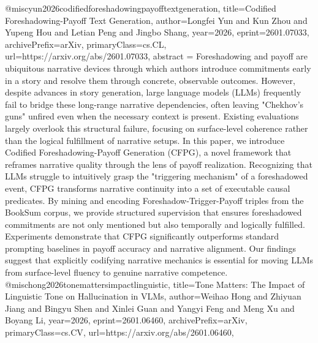 {}@misc{yun2026codifiedforeshadowingpayofftextgeneration,
      title={Codified Foreshadowing-Payoff Text Generation}, 
      author={Longfei Yun and Kun Zhou and Yupeng Hou and Letian Peng and Jingbo Shang},
      year={2026},
      eprint={2601.07033},
      archivePrefix={arXiv},
      primaryClass={cs.CL},
      url={https://arxiv.org/abs/2601.07033},
      abstract = {Foreshadowing and payoff are ubiquitous narrative devices through which authors introduce commitments early in a story and resolve them through concrete, observable outcomes. However, despite advances in story generation, large language models (LLMs) frequently fail to bridge these long-range narrative dependencies, often leaving "Chekhov's guns" unfired even when the necessary context is present. Existing evaluations largely overlook this structural failure, focusing on surface-level coherence rather than the logical fulfillment of narrative setups. In this paper, we introduce Codified Foreshadowing-Payoff Generation (CFPG), a novel framework that reframes narrative quality through the lens of payoff realization. Recognizing that LLMs struggle to intuitively grasp the "triggering mechanism" of a foreshadowed event, CFPG transforms narrative continuity into a set of executable causal predicates. By mining and encoding Foreshadow-Trigger-Payoff triples from the BookSum corpus, we provide structured supervision that ensures foreshadowed commitments are not only mentioned but also temporally and logically fulfilled. Experiments demonstrate that CFPG significantly outperforms standard prompting baselines in payoff accuracy and narrative alignment. Our findings suggest that explicitly codifying narrative mechanics is essential for moving LLMs from surface-level fluency to genuine narrative competence.}
}@misc{hong2026tonemattersimpactlinguistic,
      title={Tone Matters: The Impact of Linguistic Tone on Hallucination in VLMs}, 
      author={Weihao Hong and Zhiyuan Jiang and Bingyu Shen and Xinlei Guan and Yangyi Feng and Meng Xu and Boyang Li},
      year={2026},
      eprint={2601.06460},
      archivePrefix={arXiv},
      primaryClass={cs.CV},
      url={https://arxiv.org/abs/2601.06460},
}
